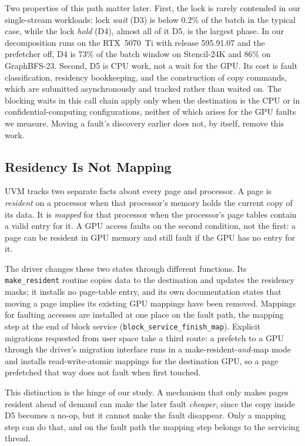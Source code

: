 Two properties of this path matter later. First, the lock is rarely
contended in our single-stream workloads: lock \emph{wait} (D3) is below
0.2\% of the batch in the typical case, while the lock \emph{hold} (D4),
almost all of it D5, is the largest phase. In our decomposition runs on the
RTX~5070~Ti with release 595.91.07 and the prefetcher off, D4 is 73\% of the
batch window on Stencil-24K and 86\% on GraphBFS-23.
Second, D5 is CPU work, not a wait for the GPU. Its cost is fault
classification, residency bookkeeping, and the construction of copy commands,
which are submitted asynchronously and tracked rather than waited on. The
blocking waits in this call chain apply only when the destination is the CPU
or in confidential-computing configurations, neither of which arises for the
GPU faults we measure. Moving a fault's
discovery earlier does not, by itself, remove this work.

\subsection{Residency Is Not Mapping}
\label{sec:bg-resident-mapped}

UVM tracks two separate facts about every page and processor. A page is
\emph{resident} on a processor when that processor's memory holds the current
copy of its data. It is \emph{mapped} for that processor when the processor's
page tables contain a valid entry for it. A GPU access faults on the second
condition, not the first: a page can be resident in GPU memory and still fault
if the GPU has no entry for it.

The driver changes these two states through different functions. Its
\texttt{make\_resident} routine copies data to the destination and updates the
residency masks; it installs no page-table entry, and its own documentation
states that moving a page implies its existing GPU mappings have been removed.
Mappings for faulting accesses are installed at one place on the fault path,
the mapping step at the end of block service
(\texttt{block\_service\_finish\_map}). Explicit migrations requested from
user space take a third route: a prefetch to a GPU through the driver's
migration interface runs in a make-resident-\emph{and}-map mode and installs
read-write-atomic mappings for the destination GPU, so a page prefetched that
way does not fault when first touched.

This distinction is the hinge of our study. A mechanism that only makes pages
resident ahead of demand can make the later fault \emph{cheaper}, since the
copy inside D5 becomes a no-op, but it cannot make the fault disappear. Only
a mapping step can do that, and on the fault path the mapping step belongs to
the servicing thread.

